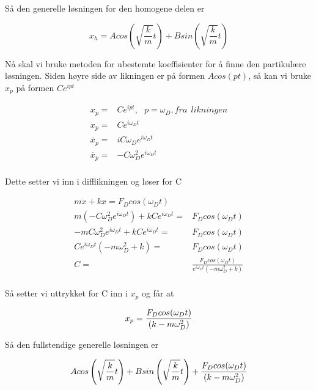 \documentclass[norsk,a4paper,12pt]{article}
\begin{document}
Så den generelle løsningen for den homogene delen er

\begin{equation}
	x_h = A cos \left(\sqrt{\frac{k}{m}}t \right) +B sin \left(\sqrt{\frac{k}{m}}t \right)
\end{equation}


Nå skal vi bruke metoden for ubestemte koeffisienter for å finne den partikulære løsningen. Siden høyre side av likningen er på formen $A cos(pt)$, så kan vi bruke $x_p$ på formen $C e^{ipt}$

\begin{align*}
	x_p =& C e^{ipt},\   \   \ p=\omega_D, fra\ \ likningen\\
	x_p =& C e^{i\omega_Dt}\\
	\dot{x_p} =& iC\omega_D e^{i\omega_Dt}\\
	\ddot{x_p} =& -C\omega_D^2 e^{i\omega_Dt}\\
\end{align*}

Dette setter vi inn i difflikningen og løser for C

\begin{align*}
	m\ddot{x} + kx = F_D cos(\omega_Dt)\\
	m\left(-C\omega_D^2e^{i\omega_Dt} \right) + k Ce^{i\omega_Dt} =& F_Dcos(\omega_Dt)\\
	-mC\omega_D^2e^{i\omega_Dt} + k Ce^{i\omega_Dt} =& F_Dcos(\omega_Dt)\\
	Ce^{i\omega_Dt} \left(-m\omega_D^2 +k \right) =& F_Dcos(\omega_Dt)\\
	C =& \frac{F_Dcos(\omega_Dt)}{e^{i\omega_Dt} \left(-m\omega_D^2 +k \right)}\\
\end{align*}

Så setter vi uttrykket for C inn i $x_p$ og får at

\begin{equation}
	x_p = \frac{F_Dcos(\omega_Dt)\\}{\left(k - m \omega_D^2 \right)}
\end{equation}

Så den fullstendige generelle løsningen er

\begin{equation}
	A cos \left(\sqrt{\frac{k}{m}}t \right) +B sin \left(\sqrt{\frac{k}{m}}t \right) + \frac{F_Dcos(\omega_Dt)\\}{\left(k - m \omega_D^2 \right)}
\end{equation}
\end{document}
